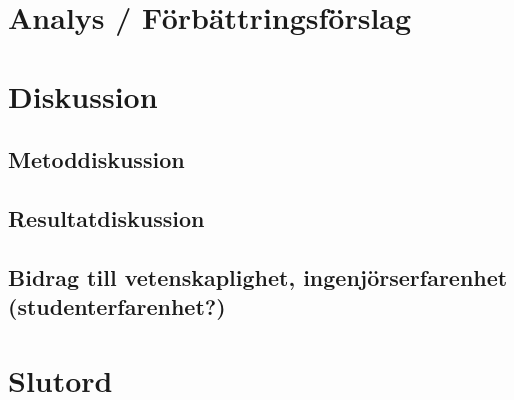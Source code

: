 \documentclass[conference]{IEEEtran}
\begin{document}
%
\section{Analys / Förbättringsförslag}

\section{Diskussion}

\subsection{Metoddiskussion}

\subsection{Resultatdiskussion}

\subsection{Bidrag till vetenskaplighet, ingenjörserfarenhet (studenterfarenhet?)}

\section{Slutord}
\end{document}
